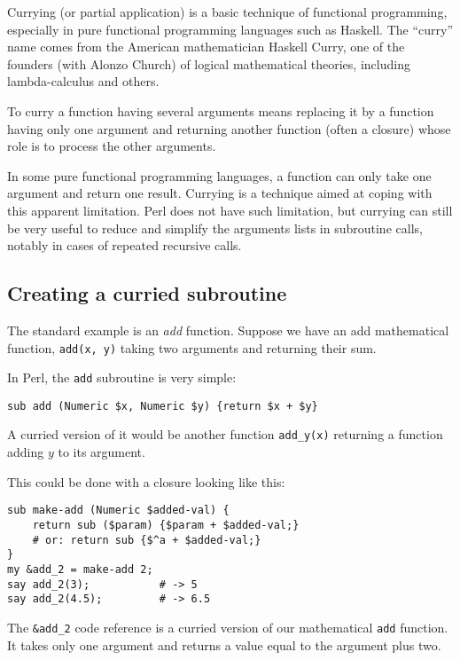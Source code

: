 Currying (or partial application) is a basic technique 
of functional programming, especially in pure functional 
programming languages such as Haskell. The ``curry'' name comes 
from the American mathematician Haskell Curry, one of the 
founders (with Alonzo Church) of logical mathematical 
theories, including lambda-calculus and others.

To curry a function having several arguments means replacing 
it by a function having only one argument and returning 
another function (often a closure) whose role is to 
process the other arguments.

In some pure functional programming languages, a function 
can only take one argument and return one result. Currying 
is a technique aimed at coping with this apparent limitation. 
Perl does not have such limitation, but currying can still 
be very useful to reduce and simplify the arguments lists 
in subroutine calls, notably in cases of repeated recursive 
calls.


\subsection{Creating a curried subroutine}

The standard example is an \emph{add} function. Suppose 
we have an add mathematical function, \verb'add(x, y)' 
taking two arguments and returning their sum. 

In Perl, the {\tt add} subroutine is very simple:

\begin{verbatim}
sub add (Numeric $x, Numeric $y) {return $x + $y}
\end{verbatim}

A curried version of it would be another function 
\verb'add_y(x)' returning a function adding $y$ to 
its argument.

This could be done with a closure looking like this:

\begin{verbatim}
sub make-add (Numeric $added-val) {
    return sub ($param) {$param + $added-val;}    
    # or: return sub {$^a + $added-val;}
}
my &add_2 = make-add 2;
say add_2(3);           # -> 5
say add_2(4.5);         # -> 6.5
\end{verbatim}

The \verb'&add_2' code reference is a curried version 
of our mathematical {\tt add} function. It takes only 
one argument and returns a value equal to the argument 
plus two.

